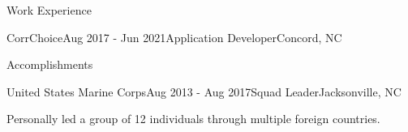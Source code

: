 \documentclass{resume}
\begin{document}
\begin{basicSection}{Work Experience}
\begin{workExperienceSection}{CorrChoice}{Aug 2017 - Jun 2021}{Application Developer}{Concord, NC}
\begin{workExperienceSectionSubSection}{Accomplishments}
            \end{workExperienceSectionSubSection}
        \end{workExperienceSection}
        \begin{workExperienceSection}{United States Marine Corps}{Aug 2013 - Aug 2017}{Squad Leader}{Jacksonville, NC}
            \item Personally led a group of 12 individuals through multiple foreign countries.
        \end{workExperienceSection}
    \end{basicSection}
\end{document}
